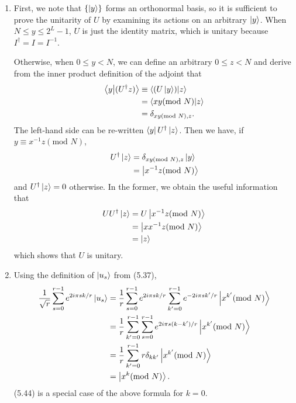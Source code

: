 \documentclass[a4paper,12pt]{article}
\begin{document}
\begin{enumerate}
    \item[\textbf{5.12:}]
        First, we note that $\{ \ket{y} \}$ forms an orthonormal basis, so it is sufficient to prove the unitarity of $U$ by examining its actions on an arbitrary $\ket{y}$. When $N \leq y \leq 2^L - 1$, $U$ is just the identity matrix, which is unitary because $I^\dagger = I = I^{-1}$. \par
        Otherwise, when $0 \leq y < N$, we can define an arbitrary $0 \leq z < N$ and derive from the inner product definition of the adjoint that
        \begin{align*}
            \braket{y}{(U^\dagger z)} &\equiv \braket{(U \ket{y})}{z} \\
            &= \braket{xy(\text{mod } N)}{z} \\
            &= \delta_{xy(\text{mod } N), z}.
        \end{align*}
        The left-hand side can be re-written $\bra{y} U^\dagger \ket{z}$. Then we have, if $y \equiv x^{-1} z (\text{mod } N)$,
        \begin{align*}
            U^\dagger \ket{z} &= \delta_{xy(\text{mod } N), z} \ket{y} \\
            &= \ket{x^{-1} z (\text{mod } N)}
        \end{align*}
        and $U^\dagger \ket{z} = 0$ otherwise. In the former, we obtain the useful information that
        \begin{align*}
            U U^\dagger \ket{z} &= U \ket{x^{-1} z (\text{mod } N)} \\
            &= \ket{x x^{-1} z (\text{mod } N)} \\
            &= \ket{z}
        \end{align*}
        which shows that $U$ is unitary.

    \item[\textbf{5.13:}]
        Using the definition of $\ket{u_s}$ from (5.37),
        \begin{align*}
            \frac{1}{\sqrt{r}} \sum_{s = 0}^{r - 1} e^{2i \pi sk/r} \ket{u_s} &= \frac{1}{r} \sum_{s = 0}^{r - 1} e^{2i \pi sk/r} \sum_{k' = 0}^{r - 1} e^{-2i \pi sk'/r} \ket{x^{k'} (\text{mod } N)} \\
            &= \frac{1}{r} \sum_{k' = 0}^{r - 1} \sum_{s = 0}^{r - 1} e^{2i \pi s(k - k')/r} \ket{x^{k'} (\text{mod } N)} \\
            &= \frac{1}{r} \sum_{k' = 0}^{r - 1} r \delta_{kk'} \ket{x^{k'} (\text{mod } N)} \\
            &= \ket{x^{k} (\text{mod } N)}.
        \end{align*}
        (5.44) is a special case of the above formula for $k = 0$.


\end{enumerate}
\end{document}
